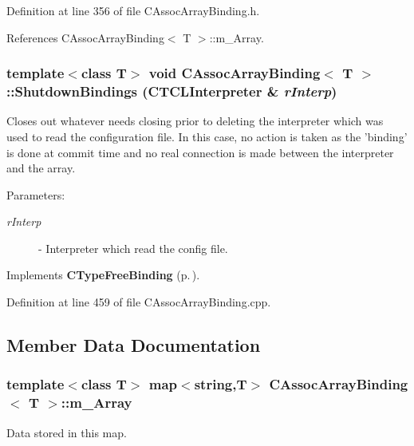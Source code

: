 Definition at line 356 of file CAssoc\-Array\-Binding.h.

References CAssoc\-Array\-Binding$<$ T $>$::m\_\-Array.
\subsubsection{\setlength{\rightskip}{0pt plus 5cm}template$<$class T$>$ void CAssoc\-Array\-Binding$<$ T $>$::Shutdown\-Bindings ({\bf CTCLInterpreter} \& {\em r\-Interp})\hspace{0.3cm}{\tt  [virtual]}}\label{classCAssocArrayBinding_a14}


Closes out whatever needs closing prior to deleting the interpreter which was used to read the configuration file. In this case, no action is taken as the 'binding' is done at commit time and no real connection is made between the interpreter and the array. \begin{Desc}
\item[Parameters: ]\par
\begin{description}
\item[{\em 
r\-Interp}]- Interpreter which read the config file. \end{description}
\end{Desc}


Implements {\bf CType\-Free\-Binding} {\rm (p.\,\pageref{classCTypeFreeBinding_a2})}.

Definition at line 459 of file CAssoc\-Array\-Binding.cpp.

\subsection{Member Data Documentation}
\subsubsection{\setlength{\rightskip}{0pt plus 5cm}template$<$class T$>$ map$<$string,T$>$ CAssoc\-Array\-Binding$<$ T $>$::m\_\-Array\hspace{0.3cm}{\tt  [private]}}\label{classCAssocArrayBinding_o0}


Data stored in this map.



